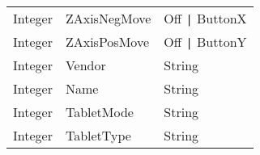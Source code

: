 \begin{tabular}[h]{|p{2cm}|p{4cm}|p{7cm}|}
 Integer & ZAxisNegMove     & Off \verb+|+ ButtonX               \\
 Integer & ZAxisPosMove     & Off \verb+|+ ButtonY               \\
 Integer & Vendor           & String                             \\
 Integer & Name             & String                             \\
 Integer & TabletMode       & String                             \\
 Integer & TabletType       & String                             \\
 \hline
\end{tabular}


